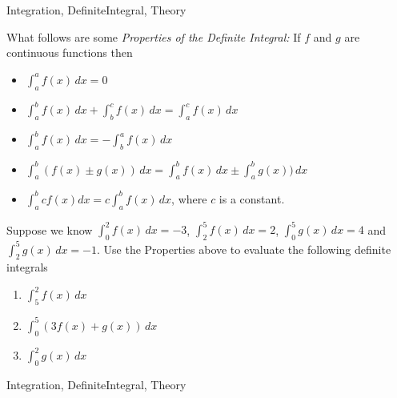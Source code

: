 \begin{tagblock}{Integration, DefiniteIntegral, Theory}
\begin{question}

What follows are some \emph{Properties of the Definite Integral:} If $f$ and $g$ are continuous functions then 
\begin{itemize}
\item $\displaystyle \int_{a}^{a} f(x) \, dx = 0$
\item $\displaystyle \int_{a}^{b} f(x) \, dx +  \int_{b}^{c} f(x) \, dx =  \int_a^c f(x) \, dx$
\item $\displaystyle \int_{a}^{b} f(x) \, dx =  -\int_{b}^{a} f(x) \, dx$
\item $\displaystyle \int_{a}^{b} (f(x) \pm g(x)) \, dx = \int_{a}^{b} f(x) \, dx  \pm \int_{a}^{b} g(x)) \, dx$
\item $\displaystyle \int_{a}^{b} cf(x)  dx =c \int_{a}^{b} f(x) \, dx $,  where $c$ is a constant.  

\end{itemize}

Suppose we know $\displaystyle \int_0^2 f(x) \, dx =-3$, $\displaystyle \int_2^5 f(x) \, dx =2$, $\displaystyle \int_0^5 g(x) \, dx =4$ and $\displaystyle \int_2^5 g(x) \, dx =-1$.  Use the Properties above to evaluate the following definite integrals
\begin{enumerate}
\item $\displaystyle \int_5^2 f(x) \, dx $

\vspace{1in}
\item $\displaystyle \int_0^5 (3f(x) + g(x)) \, dx $
\vspace{1.5in}

\item $\displaystyle \int_0^2 g(x) \, dx $

\end{enumerate}


	
	
\begin{tags}
	   Integration, DefiniteIntegral, Theory
\end{tags}
	
\begin{diary}
\end{diary}
	
\begin{solution}
	   
	    \end{enumerate}
\end{solution}
	
\end{question}

\end{tagblock}


